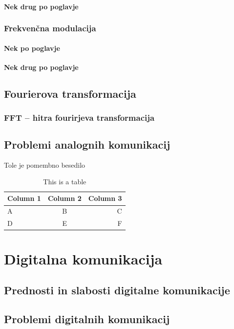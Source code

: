 \documentclass[12pt]{article}
\begin{document}
            \paragraph{Nek drug po poglavje}
        \subsubsection{Frekvenčna modulacija}
            \paragraph{Nek po poglavje}
            \paragraph{Nek drug po poglavje}

    \newpage
    \subsection{Fourierova transformacija}
        \subsubsection{FFT – hitra fourirjeva transformacija}
    \subsection{Problemi analognih komunikacij}
        Tole je pomembno besedilo

\begin{table}[h]
    \centering
    \caption{This is a table}
    \begin{tabular}{lcr}
      \hline
      Column 1 & Column 2 & Column 3 \\
      \hline
      A & B & C \\
      D & E & F \\
      \hline
    \end{tabular}
    \label{tab:table}
\end{table}  


\newpage
\section{Digitalna komunikacija}
    \subsection{Prednosti in slabosti digitalne komunikacije}
    \subsection{Problemi digitalnih komunikacij}
\end{document}

